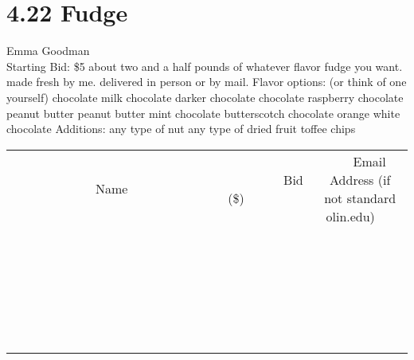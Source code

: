 \documentclass[11pt]{article}
\begin{document}
\section*{4.22 Fudge}
Emma Goodman
\\
Starting Bid: \$5
\newline
about two and a half pounds of whatever flavor fudge you want.  made fresh by me.  delivered in person or by mail.
Flavor options: (or think of one yourself)
chocolate
milk chocolate
darker chocolate
chocolate raspberry
chocolate peanut butter
peanut butter
mint chocolate
butterscotch
chocolate orange
white chocolate
Additions:
any type of nut
any type of dried fruit
toffee chips
\\[6ex]
\begin{tabular}{c c c}
~~~~~~~~~~~~~Name~~~~~~~~~~~~~ & ~~~~~~~~~Bid (\$)~~~~~~~~~  & ~~~Email Address (if not standard olin.edu)~~~\\
 & & \\
\hline
 & & \\
\hline
 & & \\
\hline
 & & \\
\hline
 & & \\
\hline
 & & \\
\hline
 & & \\
\hline
 & & \\
\hline
 & & \\
\hline
 & & \\
\hline
 & & \\
\hline
 & & \\
\hline
 & & \\
\hline
 & & \\
\hline
 & & \\
\hline
 & & \\
\hline
 & & \\
\hline
 & & \\
\hline
 & & \\
\hline
 & & \\
\hline
 & & \\
\hline
 & & \\
\hline
 & & \\
\hline
 & & \\
\hline
 & & \\
\hline
 & & \\
\hline
\end{tabular}
\newpage
\end{document}
